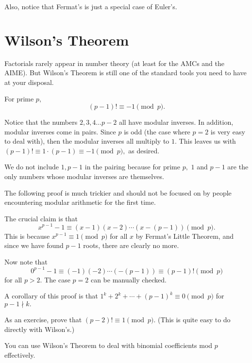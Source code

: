 \documentclass[mast]{lucky}
\begin{document}

Also, notice that Fermat's is just a special case of Euler's.

\section{Wilson's Theorem}

Factorials rarely appear in number theory (at least for the AMCs and the AIME). But Wilson's Theorem is still one of the standard tools you need to have at your disposal.

\begin{theo}
For prime $p,$ $$(p-1)!\equiv -1\pmod{p}.$$
\end{theo}

\begin{pro}[1]
Notice that the numbers $2,3,4\dots p-2$ all have modular inverses. In addition, modular inverses come in pairs. Since $p$ is odd (the case where $p=2$ is very easy to deal with), then the modular inverses all multiply to $1.$ This leaves us with $(p-1)!\equiv 1\cdot (p-1)\equiv -1\pmod{p},$ as desired.
\end{pro}

We do not include $1,p-1$ in the pairing because for prime $p,$ $1$ and $p-1$ are the only numbers whose modular inverses are themselves.

The following proof is much trickier and should not be focused on by people encountering modular arithmetic for the first time.

\begin{pro}[2]
The crucial claim is that
\[x^{p-1}-1\equiv (x-1)(x-2)\cdots(x-(p-1))\pmod{p}.\]
This is because $x^{p-1}\equiv 1\pmod{p}$ for all $x$ by Fermat's Little Theorem, and since we have found $p-1$ roots, there are clearly no more.

Now note that
\[0^{p-1}-1\equiv (-1)(-2)\cdots(-(p-1))\equiv (p-1)!\pmod{p}\]
for all $p>2.$ The case $p=2$ can be manually checked.
\end{pro}

A corollary of this proof is that $1^k+2^k+\cdots+(p-1)^k\equiv 0\pmod{p}$ for $p-1\nmid k.$

As an exercise, prove that $(p-2)!\equiv 1\pmod{p}.$ (This is quite easy to do directly with Wilson's.)

You can use Wilson's Theorem to deal with binomial coefficients mod $p$ effectively.
\end{document}
